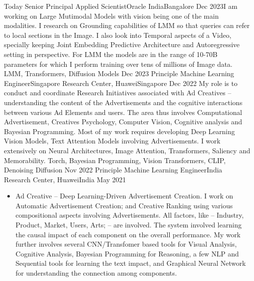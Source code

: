 %
%
%

\begin{experiences}
			\experience
	{Today} {Senior Principal Applied Scientist}{Oracle India}{Bangalore}
	{Dec 2023}{I am working on Large Mutimodal Models with vision being one of the main modalities. I research on  Grounding capabilities of LMM so that queries can refer to local sections in the Image. I also look into Temporal aspects of a Video, specially keeping Joint Embedding Predictive Architecture and Autoregressive setting in perspective. For LMM the models are in the range of 10-70B parameters for which I perform training over tens of millions of Image data. 
	}
	{LMM, Transformers, Diffusion Models }
	\emptySeparator
		\experience
	{Dec 2023} {Principle Machine Learning Engineer}{Singapore Research Center, Huawei}{Singapore}
	{Dec 2022}{
		My role is to conduct and coordinate Research Initiatives associated with Ad Creatives -- understanding the content of the Advertisements and the cognitive interactions between various Ad Elements and users. The area thus involves Computational Advertisement, Creatives Psychology, Computer Vision, Cognitive analysis and Bayesian Programming. Most of my work requires developing Deep Learning Vision Models, Text Attention Models involving Advertisements. I work extensively on Neural Architectures, Image Attention, Transformers, Saliency and Memorability.
	}
	{Torch, Bayesian Programming, Vision Transformers, CLIP, Denoising Diffusion }
	\emptySeparator
	\experience
	{Nov 2022} {Principle Machine Learning Engineer}{India Research Center, Huawei}{India}
	{May 2021}{
		\begin{itemize}
			\item Ad Creative -- Deep Learning-Driven Advertisement Creation. I work on Automatic Advertisement Creation; and Creative Ranking using various compositional aspects involving Advertisements. All factors, like -- Industry, Product, Market, Users, Arts; -- are involved. The system involved learning the causal impact of each component on the overall performance. My work further involves several CNN/Transfomer based tools for Visual Analysis, Cognitive Analysis, Bayesian Programming for Reasoning, a few NLP and Sequential tools for learning the text impact, and Graphical Neural Network for understanding the connection among components.

\end{itemize}}
\end{experiences}
